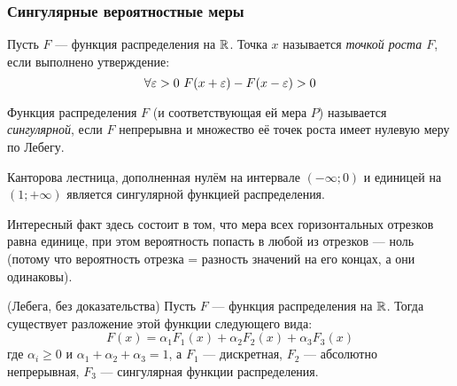 \subsubsection{Сингулярные вероятностные меры}

\begin{definition}
	Пусть $F$ --- функция распределения на $\mathbb{R}$. Точка $x$ называется \textit{точкой роста $F$}, если выполнено утверждение:
	\[
		\forall \varepsilon > 0\ F(x + \varepsilon) - F(x - \varepsilon) > 0
	\]
\end{definition}

\begin{definition}
	Функция распределения $F$ (и соответствующая ей мера $P$) называется \textit{сингулярной}, если $F$ непрерывна и множество её точек роста имеет нулевую меру по Лебегу.
\end{definition}

\begin{example}
	Канторова лестница, дополненная нулём на интервале $(-\infty; 0)$ и единицей на $(1; +\infty)$ является сингулярной функцией распределения.
	
	Интересный факт здесь состоит в том, что мера всех горизонтальных отрезков равна единице, при этом вероятность попасть в любой из отрезков --- ноль (потому что вероятность отрезка = разность значений на его концах, а они одинаковы).
\end{example}

\begin{theorem} (Лебега, без доказательства)
	Пусть $F$ --- функция распределения на $\mathbb{R}$. Тогда существует разложение этой функции следующего вида:
	\[
		F(x) = \alpha_1 F_1(x) + \alpha_2 F_2(x) + \alpha_3 F_3(x)
	\]
	где $\alpha_i \ge 0$ и $\alpha_1 + \alpha_2 + \alpha_3 = 1$, а $F_1$ --- дискретная, $F_2$ --- абсолютно непрерывная, $F_3$ --- сингулярная функции распределения.
\end{theorem}